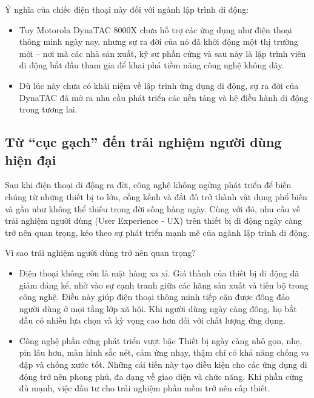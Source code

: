 \begin{flushleft}
  \hspace*{0.8cm}Ý nghĩa của chiếc điện thoại này đối với ngành lập trình di động:
  \setlength{\leftmargini}{1.5cm}
  \begin{itemize}
      \item Tuy Motorola DynaTAC 8000X chưa hỗ trợ các ứng dụng như điện thoại thông minh ngày nay, nhưng sự ra đời của nó đã khởi động một thị trường mới – nơi mà các nhà sản xuất, kỹ sư phần cứng và sau này là lập trình viên di động bắt đầu tham gia để khai phá tiềm năng công nghệ không dây.
      \item Dù lúc này chưa có khái niệm về lập trình ứng dụng di động, sự ra đời của DynaTAC đã mở ra nhu cầu phát triển các nền tảng và hệ điều hành di động trong tương lai.
  \end{itemize}
\end{flushleft}

\subsection{Từ “cục gạch” đến trải nghiệm người dùng hiện đại}
\renewcommand{\labelitemi}{--}    
    \begin{flushleft}
        \hspace*{0.8cm}Sau khi điện thoại di động ra đời, công nghệ không ngừng phát triển để biến chúng từ những thiết bị to lớn, cồng kềnh và đắt đỏ trở thành vật dụng phổ biến và gần như không thể thiếu trong đời sống hàng ngày. Cùng với đó, nhu cầu về trải nghiệm người dùng (User Experience - UX) trên thiết bị di động ngày càng trở nên quan trọng, kéo theo sự phát triển mạnh mẽ của ngành lập trình di động.
    \end{flushleft}

    \begin{flushleft}
      \hspace*{0.8cm}Vì sao trải nghiệm người dùng trở nên quan trọng?
      \setlength{\leftmargini}{1.5cm}
      \begin{itemize}
        \item Điện thoại không còn là mặt hàng xa xỉ. Giá thành của thiết bị di động đã giảm đáng kể, nhờ vào sự cạnh tranh giữa các hãng sản xuất và tiến bộ trong công nghệ. Điều này giúp điện thoại thông minh tiếp cận được đông đảo người dùng ở mọi tầng lớp xã hội. Khi người dùng ngày càng đông, họ bắt đầu có nhiều lựa chọn và kỳ vọng cao hơn đối với chất lượng ứng dụng.
        \item Công nghệ phần cứng phát triển vượt bậc Thiết bị ngày càng nhỏ gọn, nhẹ, pin lâu hơn, màn hình sắc nét, cảm ứng nhạy, thậm chí có khả năng chống va đập và chống xước tốt. Những cải tiến này tạo điều kiện cho các ứng dụng di động trở nên phong phú, đa dạng về giao diện và chức năng. Khi phần cứng đủ mạnh, việc đầu tư cho trải nghiệm phần mềm trở nên cấp thiết.
      \end{itemize}
    \end{flushleft}

